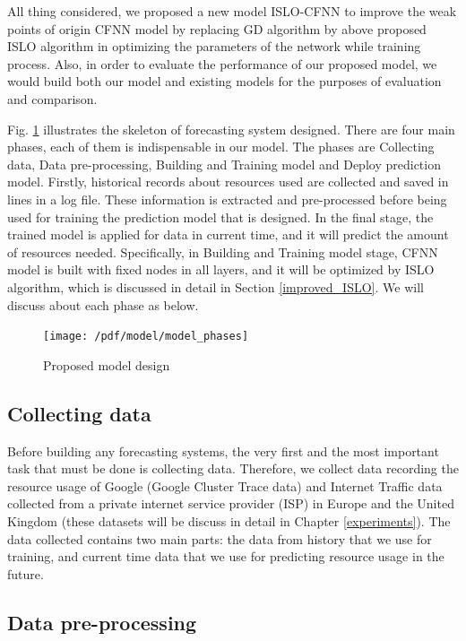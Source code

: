 \documentclass[a4paper,13pt,2p]{report}
\begin{document}
	All thing considered, we proposed a new model ISLO-CFNN to improve the weak points of origin CFNN model by replacing GD algorithm by above proposed ISLO algorithm in optimizing the parameters of the network while training process. Also, in order to evaluate the performance of our proposed model, we would build both our model and existing models for the purposes of evaluation and comparison.
	
	Fig. \ref{fig_model_phases} illustrates the skeleton of forecasting system designed. There are four main phases, each of them is indispensable in our model. The phases are Collecting data, Data pre-processing, Building and Training model and Deploy prediction model. Firstly, historical records about resources used are collected and saved in lines in a log file. These information is extracted and pre-processed before being used for training the prediction model that is designed. In the final stage, the trained model is applied for data in current time, and it will predict the amount of resources needed. Specifically, in Building and Training model stage, CFNN model is built with fixed nodes in all layers, and it will be optimized by ISLO algorithm, which is discussed in detail in Section \ref{improved_ISLO}. We will discuss about each phase as below.
	
\begin{figure}[!ht] 
   \centering
   \texttt{[image: /pdf/model/model\_phases]}
  \caption{Proposed model design} 
  \label{fig_model_phases} 
\end{figure}
	
\subsection{Collecting data}
\label{collect_data}
	
	Before building any forecasting systems, the very first and the most important task that must be done is collecting data. Therefore, we collect data recording the resource usage of Google (Google Cluster Trace data) and Internet Traffic data collected from a private internet service provider (ISP) in Europe and the United Kingdom (these datasets  will be discuss in detail in Chapter \ref{experiments}). The data collected contains two main parts: the data from history that we use for training, and current time data that we use for predicting resource usage in the future.  
	

\subsection{Data pre-processing}
\label{data-pre}
\end{document}
